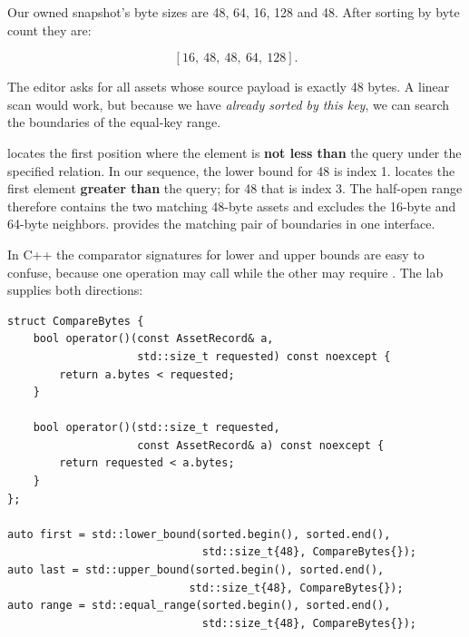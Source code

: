 \hypertarget{05-engine-i-ch006-once-byte-counts-are-ordered-we-can-find-an-entire-equal-size-range}{}

Our owned snapshot's byte sizes are 48, 64, 16, 128 and 48. After sorting by byte count they are:

\[
[16,\ 48,\ 48,\ 64,\ 128].
\]

The editor asks for all assets whose source payload is exactly 48 bytes. A linear scan would work, but because we have \emph{already sorted by this key}, we can search the boundaries of the equal-key range.

 locates the first position where the element is \textbf{not less than} the query under the specified relation. In our sequence, the lower bound for 48 is index 1.  locates the first element \textbf{greater than} the query; for 48 that is index 3. The half-open range \BookInlineCode{{{[}}{1}{,}{3}{)}}{{[}1,3)} therefore contains the two matching 48-byte assets and excludes the 16-byte and 64-byte neighbors.  provides the matching pair of boundaries in one interface.

In C++ the comparator signatures for lower and upper bounds are easy to confuse, because one operation may call  while the other may require . The lab supplies both directions:

\begin{verbatim}
struct CompareBytes {
    bool operator()(const AssetRecord& a,
                    std::size_t requested) const noexcept {
        return a.bytes < requested;
    }

    bool operator()(std::size_t requested,
                    const AssetRecord& a) const noexcept {
        return requested < a.bytes;
    }
};

auto first = std::lower_bound(sorted.begin(), sorted.end(),
                              std::size_t{48}, CompareBytes{});
auto last = std::upper_bound(sorted.begin(), sorted.end(),
                            std::size_t{48}, CompareBytes{});
auto range = std::equal_range(sorted.begin(), sorted.end(),
                              std::size_t{48}, CompareBytes{});
\end{verbatim}

